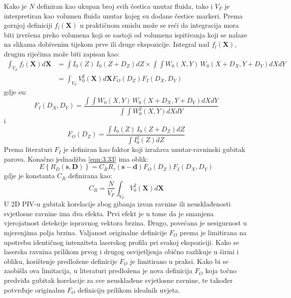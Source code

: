 Kako je $N$ definiran kao ukupan broj svih čestica unutar fluida, tako i $V_{F}$ je interpretiran kao volumen fluida unutar kojeg su dodane čestice markeri. Prema gornjoj definiciji $f_{l}(\boldsymbol{X})$ u praktičnom smislu može se reći da integracija mora biti izvršena preko volumena koji se sastoji od volumena ispitivanja koji se nalaze na slikama dobivenim tijekom prve ili druge ekspozicije. Integral nad $f_{l}(\boldsymbol{X})$, drugim riječima može biti zapisan kao:
\begin{equation}
	\begin{split}
		\int_{V_{F}}f_{l}(\boldsymbol{X})d\boldsymbol{X}  &= \int I_{0}(Z)\, I_{0}(Z+D_{Z})dZ \times \int \int W_{0}(X,Y)\, W_{0}(X+D_{X},Y+D_{Y})dXdY \\
		&=\int_{V_{F}}V_{0}^{2}(\boldsymbol{X})d\boldsymbol{X}\dot F_{O}(D_{Z})F_{I}(D_{X},D_{Y})
	\end{split}
	\label{eqn:3.34}
\end{equation}
gdje su:
\begin{equation}
	F_{I}(D_{X},D_{Y})=\dfrac{\int \int W_{0}(X, Y)\, W_{0}(X+D_{X}, Y+D_{Y})dXdY}{\int \int W_{0}^{2}(X, Y)dXdY}
	\label{eqn:3.35}
\end{equation}
i
\begin{equation}
	F_{O}(D_{Z})=\dfrac{\int I_{0}(Z)\, I_{0}(Z+D_{Z})dZ}{\int I_{0}^{2}(Z)dZ}
	\label{eqn:3.36}
\end{equation}
Prema literaturi \cite{keane1992theory} $F_{I}$ je definiran kao faktor koji izražava unutar-ravninski gubitak parova. Konačno jednadžba \ref{eqn:3.33} ima oblik:
\begin{equation}
	E\left\{R_{D}(\boldsymbol{s}, \boldsymbol{D})\right\}=C_{R}R_{\tau}(\boldsymbol{s}-\boldsymbol{d})F_{O}(D_{Z})F_{I}(D_{X},D_{Y})
	\label{eqn:3.37}
\end{equation}
gdje je konstanta $C_{R}$ definirana kao:
\begin{equation*}
	C_{R}=\dfrac{N}{V_{F}}\int_{V_{F}}V_{0}^{2}(\boldsymbol{X})d\boldsymbol{X}
\end{equation*}
U 2D PIV-u gubitak korelacije zbog gibanja izvan ravnine ili neusklađenosti svjetlosne ravnine ima dva efekta. Prvi efekt je u tome da je smanjena vjerojatnost detekcije ispravnog vektora brzina. Drugo, povećana je nesigurnost u mjerenjima polja brzina. Valjanost originalne definicije $F_{O}$ prema \cite{keane1992theory} je limitirana na upotrebu identičnog intenziteta laserskog profila pri svakoj ekspoziciji. Kako se laserska ravnina prilikom prvog i drugog osvijetljenja obično razlikuje u širini i obliku, korištenje predložene definicije $F_{O}$ je limitirano u praksi. Kako bi se zaobišla ova limitacija, u literaturi \cite{scharnowski2017generalization} predložena je nova definicija $F_{O}$ koja točno predviđa gubitak korelacije za sve neusklađene svjetlosne ravnine, te također potvrđuje originalnu $F_{O}$ definiciju prilikom idealnih uvjeta. 